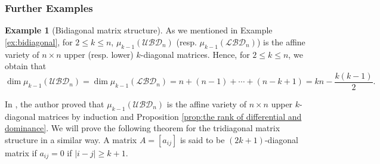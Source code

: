 \documentclass[reqno]{amsart}
\theoremstyle{definition}
\newtheorem{example}[theorem]{Example}
\numberwithin{equation}{section}
\begin{document}
\subsubsection{Further Examples}

\begin{example}[Bidiagonal matrix structure]\label{ex:dimension for bidiagonal structure}
    As we mentioned in Example \ref{ex:bidiagonal}, for $2 \leq k \leq n$, $\mu_{k-1}(\mathcal{UBD}_n)$ (resp. $\mu_{k-1}(\mathcal{LBD}_n)$) is the affine variety of $n \times n$ upper (resp. lower) $k$-diagonal matrices. Hence, for $2 \leq k \leq n$, we obtain that
    \begin{equation*}
        \dim \mu_{k-1}(\mathcal{UBD}_n)= \dim \mu_{k-1}(\mathcal{LBD}_n)= n+(n-1)+\cdots+(n-k+1)=kn-\frac{k(k-1)}{2}.
    \end{equation*}
\end{example}

In \cite{ye2017new}, the author proved that $\mu_{k-1}(\mathcal{UBD}_n)$ is the affine variety of $n \times n$ upper $k$-diagonal matrices by induction and Proposition \ref{prop:the rank of differential and dominance}. We will prove the following theorem for the tridiagonal matrix structure in a similar way. A matrix $A=[a_{ij}]$ is said to be $(2k+1)$-diagonal matrix if $a_{ij}=0$ if $|i-j| \geq k+1$. 
\end{document}
